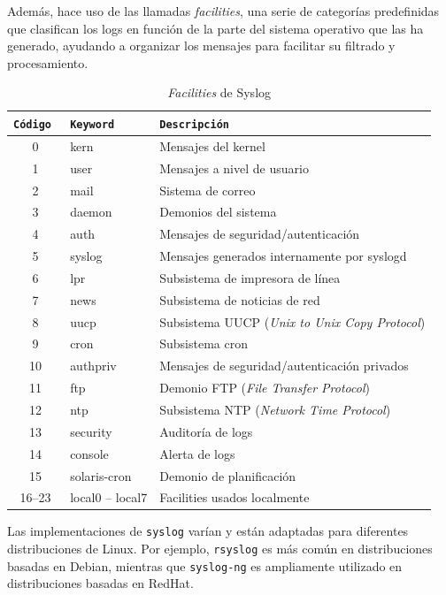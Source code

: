 Además, hace uso de las llamadas \textit{facilities}, una serie de categorías predefinidas que clasifican los logs en función de la parte del sistema operativo que las ha generado, ayudando a organizar los mensajes para facilitar su filtrado y procesamiento.

\newpage

\begin{table}[H]
\centering
\footnotesize
\begin{tabular}{|c|l|p{8cm}|}
\hline
\rowcolor{graylight}\texttt{Código } & \texttt{Keyword} & \texttt{Descripción} \\
\hline
0 & kern & Mensajes del kernel \\
\hline
1 & user & Mensajes a nivel de usuario \\
\hline
2 & mail & Sistema de correo \\
\hline
3 & daemon & Demonios del sistema \\
\hline
4 & auth & Mensajes de seguridad/autenticación \\
\hline
5 & syslog & Mensajes generados internamente por syslogd \\
\hline
6 & lpr & Subsistema de impresora de línea \\
\hline
7 & news & Subsistema de noticias de red \\
\hline
8 & uucp & Subsistema \gls{UUCP} (\textit{Unix to Unix Copy Protocol}) \\
\hline
9 & cron & Subsistema cron \\
\hline
10 & authpriv & Mensajes de seguridad/autenticación privados \\
\hline
11 & ftp & Demonio \gls{FTP} (\textit{File Transfer Protocol}) \\
\hline
12 & ntp & Subsistema \gls{NTP} (\textit{Network Time Protocol}) \\
\hline
13 & security & Auditoría de logs \\
\hline
14 & console & Alerta de logs \\
\hline
15 & solaris-cron & Demonio de planificación \\
\hline
16–23 & local0 – local7 & Facilities usados localmente \\
\hline
\end{tabular}
\caption{\textit{Facilities} de Syslog}
\label{tab:syslog_facilities}
\end{table}

Las implementaciones de \verb|syslog| varían y están adaptadas para diferentes distribuciones de Linux. Por ejemplo, \verb|rsyslog| es más común en distribuciones basadas en Debian, mientras que \verb|syslog-ng| \footnotemark es ampliamente utilizado en distribuciones basadas en RedHat.

